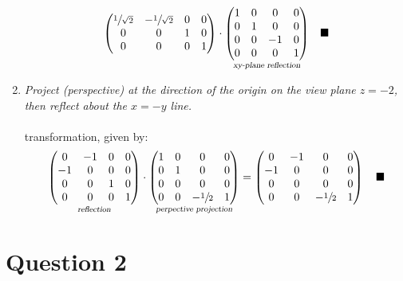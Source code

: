 \documentclass{article}
\newcommand{\proofend}{\quad\blacksquare}
\newcommand{\question}[1]{\section*{Question #1}\vspace{.5cm}}
\begin{document}
\begin{enumerate}
$${\begin{pmatrix}
                \sfrac{1}{\sqrt{2}}&-\sfrac{1}{\sqrt{2}}&0&0\\
                0&0&1&0\\
                0&0&0&1
            \end{pmatrix}}
            \cdot
            \underset{\textsl{xy-plane reflection}}{\begin{pmatrix}1&0&0&0\\0&1&0&0\\0&0&-1&0\\0&0&0&1\end{pmatrix}}\proofend
        $$
        \newpage
        \item \textsl{Project (perspective) at the direction of the origin on the view plane $z=-2$, then reflect about the $x=-y$ line.}\\\\
         transformation, given by:
        $$
            \underset{\textsl{reflection}}{
                \begin{pmatrix}
                    0&-1&0&0\\
                    -1&0&0&0\\
                    0&0&1&0\\
                    0&0&0&1
                \end{pmatrix}
            }
            \cdot
            \underset{\textsl{perpective projection}}{
                \begin{pmatrix}
                    1&0&0&0\\
                    0&1&0&0\\
                    0&0&0&0\\
                    0&0&-\sfrac{1}{2}&1
                \end{pmatrix}
            }
            =
            \begin{pmatrix}
                0&-1&0&0\\
                -1&0&0&0\\
                0&0&0&0\\
                0&0&-\sfrac{1}{2}&1
            \end{pmatrix}\proofend
        $$
    \end{enumerate}
    \vspace{1cm}
    \question{2}
\end{document}
